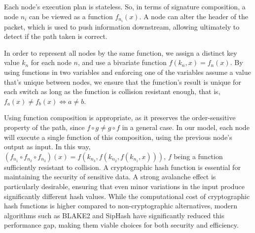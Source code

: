 Each node's execution plan is stateless. So, in terms of signature composition, a node $n_i$ can be viewed as a function $f_{n_i} (x)$. A node can alter the header of the packet, which
is used to push information downstream,
allowing ultimately to detect if the path taken is correct.

In order to represent all nodes by the same function, we assign a distinct key value $k_{n}$ for each node $n$, and use a bivariate function $f(k_{n}, x) = f_{n} (x)$.
By using functions in two variables and enforcing one of the variables assume a value that's unique between nodes, we ensure that the function's result is unique for each switch as long as the function is collision resistant enough, that is, $f_{a} (x) \neq f_{b} (x) \iff a \neq b$.

Using function composition is appropriate, as it preserves the order-sensitive property of the path, since $f \circ g \neq g \circ f$ in a general case.
In our model, each node will execute a single function of this composition, using the previous node's output as input.
In this way, $ (f_{n_1} \circ f_{n_2} \circ f_{n_3})(x) = f(k_{n_3}, f(k_{n_2}, f(k_{n_1}, x))) $, $f$ being a function sufficiently resistant to collision. A cryptographic hash function is essential for maintaining the security of sensitive data. A strong avalanche effect is particularly desirable, ensuring that even minor variations in the input produce significantly different hash values. While the computational cost of cryptographic hash functions is higher compared to non-cryptographic alternatives, modern algorithms such as BLAKE2\cite{BLAKE2} and SipHash\cite{siphash} have significantly reduced this performance gap, making them viable choices for both security and efficiency.
